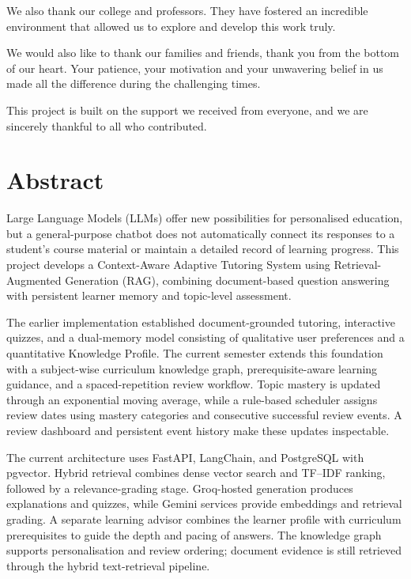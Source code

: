 \documentclass[11pt, a4paper, oneside]{report}
\begin{document}
We also thank our college and professors. They have fostered an
incredible environment that allowed us to explore and develop this work truly.

We would also like to thank our families and friends, thank you from the bottom of our heart.
Your patience, your motivation and your unwavering belief in us made all
the difference during the challenging times.

This project is built on the support we received from everyone, and we are
sincerely thankful to all who contributed.

\newpage
\thispagestyle{plain}
\chapter*{Abstract}

Large Language Models (LLMs) offer new possibilities for personalised education, but a general-purpose chatbot does not automatically connect its responses to a student's course material or maintain a detailed record of learning progress. This project develops a Context-Aware Adaptive Tutoring System using Retrieval-Augmented Generation (RAG), combining document-based question answering with persistent learner memory and topic-level assessment.

The earlier implementation established document-grounded tutoring, interactive quizzes, and a dual-memory model consisting of qualitative user preferences and a quantitative Knowledge Profile. The current semester extends this foundation with a subject-wise curriculum knowledge graph, prerequisite-aware learning guidance, and a spaced-repetition review workflow. Topic mastery is updated through an exponential moving average, while a rule-based scheduler assigns review dates using mastery categories and consecutive successful review events. A review dashboard and persistent event history make these updates inspectable.

The current architecture uses FastAPI, LangChain, and PostgreSQL with pgvector. Hybrid retrieval combines dense vector search and TF--IDF ranking, followed by a relevance-grading stage. Groq-hosted generation produces explanations and quizzes, while Gemini services provide embeddings and retrieval grading. A separate learning advisor combines the learner profile with curriculum prerequisites to guide the depth and pacing of answers. The knowledge graph supports personalisation and review ordering; document evidence is still retrieved through the hybrid text-retrieval pipeline.
\end{document}
